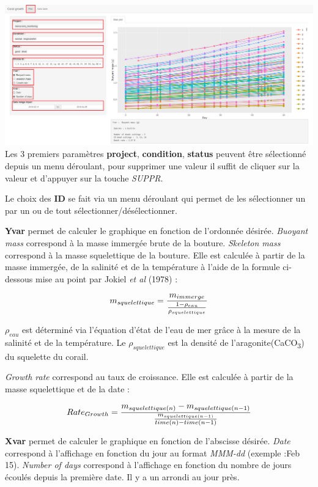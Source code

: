 \documentclass[]{book}
\begin{document}
\includegraphics{image/notebook-plot2.png} Les 3 premiers paramètres
\textbf{project}, \textbf{condition}, \textbf{status} peuvent être
sélectionné depuis un menu déroulant, pour supprimer une valeur il
suffit de cliquer sur la valeur et d'appuyer sur la touche \emph{SUPPR}.

Le choix des \textbf{ID} se fait via un menu déroulant qui permet de les
sélectionner un par un ou de tout sélectionner/désélectionner.

\textbf{Yvar} permet de calculer le graphique en fonction de l'ordonnée
désirée. \emph{Buoyant mass} correspond à la masse immergée brute de la
bouture. \emph{Skeleton mass} correspond à la masse squelettique de la
bouture. Elle est calculée à partir de la masse immergée, de la salinité
et de la température à l'aide de la formule ci-dessous mise au point par
Jokiel \emph{et al} (1978) :

\begin{equation}
\large
  m_{squelettique} = \frac {m_{immerge}}{ \frac{1 - \rho_{eau}}{ \rho_{squelettique}}}
\end{equation}

\(\rho_{eau}\) est déterminé via l'équation d'état de l'eau de mer grâce
à la mesure de la salinité et de la température. Le
\(\rho_{squelettique}\) est la densité de
l'aragonite(CaCO\textsubscript{3}) du squelette du corail.

 \emph{Growth rate} correspond au taux de croissance. Elle est calculée
à partir de la masse squelettique et de la date :

\begin{equation}
\large
  Rate_{Growth} = \frac {m_{squelettique(n)}- m_{squelettique(n-1)}}{ \frac{m_{squelettique(n-1)}}{time(n) - time(n-1)}}
\end{equation}

\textbf{Xvar} permet de calculer le graphique en fonction de l'abscisse
désirée. \emph{Date} correspond à l'affichage en fonction du jour au
format \emph{MMM-dd} (exemple :Feb 15). \emph{Number of days} correspond
à l'affichage en fonction du nombre de jours écoulés depuis la première
date. Il y a un arrondi au jour près.
\end{document}
